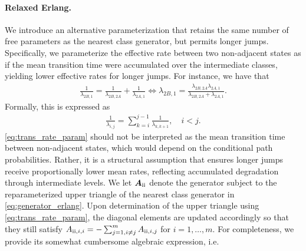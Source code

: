 \documentclass{article}
\newcommand{\RN}[1]{\textup{\uppercase\expandafter{\romannumeral#1}}}
\begin{document}
\paragraph{Relaxed Erlang.} 
We introduce an alternative parameterization that retains the same number of free parameters as the nearest class generator, but permits longer jumps. %
Specifically, we parameterize the effective rate between two non-adjacent states as if the mean transition time were accumulated over the intermediate classes, yielding lower effective rates for longer jumps.
For instance, we have that
\begin{align*}
    \frac{1}{\lambda_{2B, 1}} = \frac{1}{\lambda_{2B, 2A}} + \frac{1}{\lambda_{2A, 1}}
    \iff \lambda_{2B,1} = \frac{\lambda_{2B, 2A} \lambda_{2A, 1}}{\lambda_{2B, 2A} + \lambda_{2A, 1}}. 
\end{align*}
Formally, this is expressed as
\begin{align}
    \frac{1}{\lambda_{i,j}} = \sum_{k = i}^{j-1} \frac{1}{\lambda_{k,k+1}}, \quad i < j. \label{eq:trans_rate_param}
\end{align}
\cref{eq:trans_rate_param} should not be interpreted as the mean transition time between non-adjacent states, which would depend on the conditional path probabilities. Rather, it is a structural assumption that ensures longer jumps receive proportionally lower mean rates, reflecting accumulated degradation through intermediate levels.
We let $\bm{A}_{\RN{2}}$ denote the generator subject to the reparameterized upper triangle of the nearest class generator in \cref{eq:generator_erlang}.
Upon determination of the upper triangle using \cref{eq:trans_rate_param}, the diagonal elements are updated accordingly so that they still satisfy $A_{\RN{2},i,i}= -\sum_{j=1, i \neq j}^m A_{\RN{2},i,j}$ for $i = 1, \dots, m$. For completeness, we provide its somewhat cumbersome algebraic expression, i.e.
\end{document}

